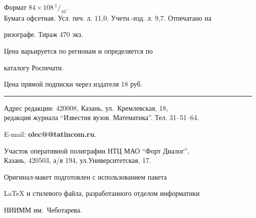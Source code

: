 Формат $84\times 108 \,^1/_{16}.$\\


Бумага офсетная. Усл. печ. л. 11,0. Учетн.-изд. л. 9,7. Отпечатано на 


ризографе. Тираж 470 экз. 





\noindent Цена варьируется по регионам и определяется по 


каталогу Роспечати. 





\noindent Цена прямой подписки через издателя 18 руб. 


\bigskip


\hrule


\bigskip


\noindent Адрес редакции: 420008, Казань, ул.~Кремлевская, 18,\\  


редакция журнала  ``Известия вузов. Математика''. Тел. 31--51--64.





\noindent E-mail: {\bf olec@@tatincom.ru}. \par


\bigskip 


\noindent Участок оперативной полиграфии НТЦ МАО  ``Форт Диалог'', \\


Казань, 420503, а/я 194, ул.Университетская, 17. \par


\bigskip


\noindent Оригинал-макет подготовлен с использованием пакета


\AmS\LaTeX{} и стилевого файла, разработанного отделом информатики


НИИММ им.~Чеботарева.








